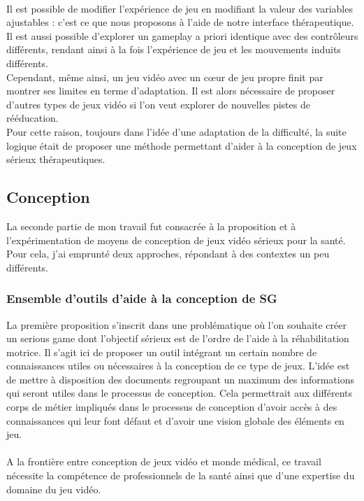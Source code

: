\paragraph{}
Il est possible de modifier l'expérience de jeu en modifiant la valeur des variables ajustables : c'est ce que nous proposons à l'aide de notre interface thérapeutique. Il est aussi possible d'explorer un gameplay a priori identique avec des contrôleurs différents, rendant ainsi à la fois l'expérience de jeu et les mouvements induits différents.
\\Cependant, même ainsi, un jeu vidéo avec un cœur de jeu propre finit par montrer ses limites en terme d'adaptation. Il est alors nécessaire de proposer d'autres types de jeux vidéo si l'on veut explorer de nouvelles pistes de rééducation.\\
Pour cette raison, toujours dans l'idée d'une adaptation de la difficulté, la suite logique était de proposer une méthode permettant d'aider à la conception de jeux sérieux thérapeutiques.
 
\subsection{Conception}
	La seconde partie de mon travail fut consacrée à la proposition et à l'expérimentation de moyens de conception de jeux vidéo sérieux pour la santé. Pour cela, j'ai emprunté deux approches, répondant à des contextes un peu différents.
	
	\subsubsection{Ensemble d'outils d'aide à la conception de SG}
	La première proposition s'inscrit dans une problématique où l'on souhaite créer un serious game dont l'objectif sérieux est de l'ordre de l'aide à la réhabilitation motrice. Il s'agit ici de proposer un outil intégrant un certain nombre de connaissances utiles ou nécessaires à la conception de ce type de jeux. L'idée est de mettre à disposition des documents regroupant un maximum des informations qui seront utiles dans le processus de conception. Cela permettrait aux différents corps de métier impliqués dans le processus de conception d'avoir accès à des connaissances qui leur font défaut et d'avoir une vision globale des éléments en jeu.
	
		\paragraph{}
A la frontière entre conception de jeux vidéo et monde médical, ce travail nécessite la compétence de professionnels de la santé ainsi que d’une expertise du domaine du jeu vidéo.
